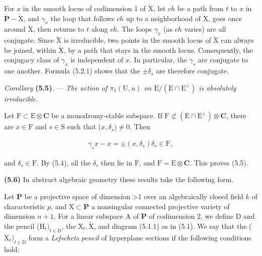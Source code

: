 \documentclass[10pt,leqno]{article}
\begin{document}
\noindent For \(x\) in the smooth locus of codimension 1 of \(\check{\mathrm{X}}\), let \(ch\) be a path from \(t\) to \(x\) in \(\check{\mathbf{P}}- \check{\mathrm{X}}\), and \(\gamma _{x}\) the loop that follows \(ch\) up to a neighborhood of \(\check{\mathrm{X}}\), goes once around \(\check{\mathrm{X}}\), then returns to \(t\) along \(ch\). The loops \(\gamma _{x}\) (as \(ch\) varies) are all conjugate. Since \(\check{\mathrm{X}}\) is irreducible, two points in the smooth locus of \(\check{\mathrm{X}}\) can always be joined, within \(\check{\mathrm{X}}\), by a path that stays in the smooth locus. Consequently, the conjugacy class of \(\gamma _{x}\) is independent of \(x\). In particular, the \(\gamma _{s}\) are conjugate to one another. Formula (5.2.1) shows that the \(\pm \delta _{s}\) are therefore conjugate.\par

\noindent \emph{Corollary} \textbf{(5.5)}. — {\itshape The action of \(\pi _{1}(\mathrm{U},u)\) on \(\mathrm{E}/(\mathrm{E}\cap \mathrm{E}^{\perp })\) is absolutely irreducible.}\par

\noindent Let \(\mathrm{F}\subset \mathrm{E}\otimes \mathbf{C}\) be a monodromy-stable subspace. If \(\mathrm{F}\not\subset (\mathrm{E}\cap \mathrm{E}^{\perp })\otimes \mathbf{C}\), there are \(x\in \mathrm{F}\) and \(s\in \mathrm{S}\) such that (\(x,\delta _{s})\ne 0\). Then\par

\begin{equation*}\begin{gathered}\gamma _{s} x- x = \pm (x,\delta _{s})\delta _{s} \in  \mathrm{F},\end{gathered}\end{equation*}

\noindent and \(\delta _{s}\in \mathrm{F}\). By (5.4), all the \(\delta _{s}\) then lie in \(\mathrm{F}\), and  \(\mathrm{F}=\mathrm{E}\otimes \mathbf{C}\).  This proves (5.5).\par

\noindent \textbf{(5.6)} In abstract algebraic geometry these results take the following form.\par

\noindent Let \(\mathbf{P}\) be a projective space of dimension >1 over an algebraically closed field \(k\) of characteristic \(p\), and \(\mathrm{X}\subset \mathbf{P}\) a nonsingular connected projective variety of dimension \(n+1\). For a linear subspace \(\mathrm{A}\) of \(\mathbf{P}\) of codimension 2, we define D and the pencil (\(\mathrm{H}_{t})_{t\in \mathrm{D}}\), the \(\mathrm{X}_{t}, \widetilde{\mathrm{X}}\), and diagram (5.1.1) as in (5.1). We say that the (\(\mathrm{X}_{t})_{t\in \mathrm{D}}\) form a \emph{Lefschetz pencil} of hyperplane sections if the following conditions hold:\par
\end{document}
